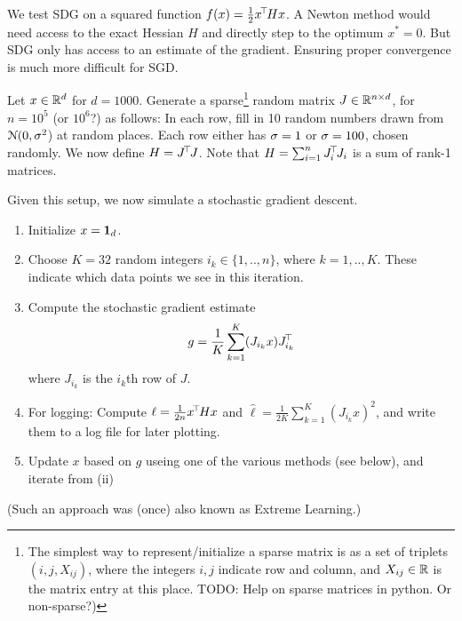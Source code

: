 

\renewcommand{\course}{Machine Learning}
\renewcommand{\exnum}{0}

\exercises



We test SDG on a squared function $f(x) = \frac{1}{2} x^{\!\top\!} H x$. A Newton
method would need access to the exact Hessian $H$ and directly step to
the optimum $x^*=0$. But SDG only has access to an estimate of the
gradient. Ensuring proper convergence is much more difficult for SGD.

Let $x\in{\mathbb{R}}^d$ for $d=1000$. Generate a sparse\footnote{The simplest
way to represent/initialize a sparse matrix is as a set of triplets
$(i,j,X_{ij})$, where the integers $i,j$ indicate row and column, and
$X_{ij}\in{\mathbb{R}}$ is the matrix entry at this place. TODO: Help on
sparse matrices in python. Or non-sparse?)} random matrix
$J\in{\mathbb{R}}^{n\times d}$, for $n=10^5$ (or $10^6$?) as follows: In each
row, fill in 10 random numbers drawn from ${\cal N}(0,\sigma^2$) at random
places. Each row either has $\sigma=1$ or $\sigma=100$, chosen randomly. We
now define $H = J^{\!\top\!} J$. Note that $H=\sum_{i=1}^n J_i^{\!\top\!} J_i$ is a
sum of rank-1 matrices.

Given this setup, we now simulate a stochastic gradient descent.
\begin{enumerate}
\item Initialize $x={{\bf 1}}_d$.
\item Choose $K=32$ random integers $i_k \in \{1,..,n\}$, where $k=1,..,K$. These indicate which data points we see in this iteration.
\item Compute the stochastic gradient estimate
$$ g = \frac{1}{K} \sum_{k=1}^K (J_{i_k} x) J_{i_k}^{\!\top\!} $$
where $J_{i_k}$ is the $i_k$th row of $J$.
\item For logging: Compute $\ell=\frac{1}{2n} x^{\!\top\!} H x$ and $\hat\ell=\frac{1}{2K} \sum_{k=1}^K (J_{i_k} x)^2$, and write them to a log file for later plotting.
\item Update $x$ based on $g$ useing one of the various methods (see below), and iterate from (ii)
\end{enumerate}





(Such an approach was (once) also known as Extreme Learning.)


